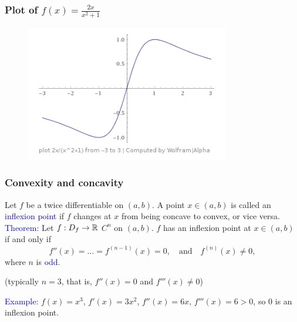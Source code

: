 \documentclass[11pt,aspectratio=169]{beamer}
\begin{document}
\begin{frame}
\frametitle{Plot of $f(x)=\frac{2x}{x^2+1}$}

\begin{figure}
\includegraphics[width=3.5in]{img/ima1} 
\end{figure}

\end{frame}

\begin{frame}
\frametitle{Convexity and concavity}
Let $f$ be a twice differentiable on $(a,b)$. A point $x \in (a,b)$ is called an \textcolor{blue}{inflexion point} if $f$ changes at $x$ from being concave to convex, or vice versa.
\vskip 12pt
\textcolor{blue}{Theorem:} Let $f:D_f \rightarrow \mathbb R$ $C^n$ on $(a,b)$. $f$ has an inflexion point at $x \in (a,b)$ if and only if
$$
f''(x)=\dots=f^{(n-1)}(x)=0, \quad \text{and} \quad f^{(n)}(x) \neq 0,
$$
where $n$ is \textcolor{blue}{odd}.

\begin{tiny} (typically $n=3$, that is, $f''(x)=0$ and $f'''(x) \neq 0$)\end{tiny}
\vskip 12pt
 \textcolor{blue}{Example:} $f(x)=x^3$, $f'(x)=3x^2$, $f''(x)=6x$, $f'''(x)=6>0$, 
so 0 is an inflexion point.


\end{frame}
\end{document}
